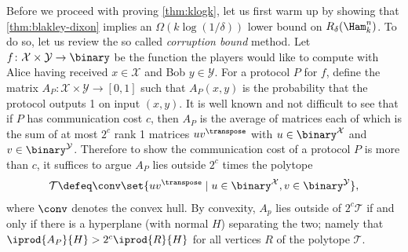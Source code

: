 \endgroup
Before we proceed with proving \autoref{thm:klogk}, let us
first warm up by showing that \autoref{thm:blakley-dixon} 
implies an  $\Omega(k\log(1/\delta))$ lower bound on 
$R_\delta(\Ham^n_k)$.
To do so, let us review the so called {\em corruption bound}
method. Let  $f\colon\mathcal{X}\times\mathcal{Y}\to\binary$ 
be the function the players would like to compute with 
Alice having received $x\in \mathcal{X}$ and Bob $y\in \mathcal{Y}$. 
For a protocol $P$ for $f$, define the matrix 
$A_P\colon\mathcal{X}\times\mathcal{Y}\to[0,1]$ 
such that $A_P(x,y)$ is the probability
that the protocol outputs 1 on input $(x,y)$.
It is well known and not difficult to see that
if $P$ has communication cost $c$, then $A_P$ is the
average of matrices each of which is the sum of at most
$2^c$ rank 1 matrices $u v^\transpose$ with 
$u\in \binary^\mathcal{X}$ and $v\in\binary^\mathcal{Y}$.
Therefore to show the communication cost of a protocol
$P$ is more than $c$, it suffices to argue $A_P$ lies
outside $2^c$ times the polytope
\begin{align*}
\mathcal{T}\defeq 
\conv\set{uv^\transpose\mid 
u\in\binary^\mathcal{X}, v\in\binary^\mathcal{Y}},
\end{align*}
where $\conv$ denotes the convex hull. By convexity, 
$A_p$ lies outside of $2^c\mathcal{T}$ if and only if there 
is a hyperplane (with normal $H$) separating the two; 
namely that $\iprod{A_P}{H}>2^c\iprod{R}{H}$ for all 
vertices $R$ of the polytope $\mathcal{T}$.

